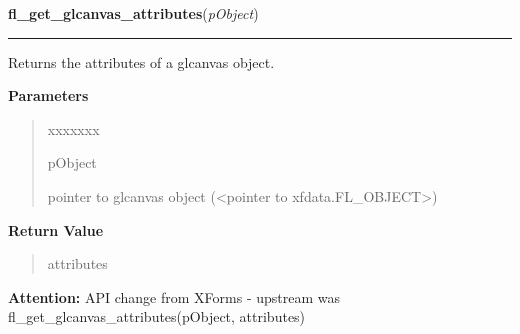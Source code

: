 \hspace{.8\funcindent}\begin{boxedminipage}{\funcwidth}

    \raggedright \textbf{fl\_get\_glcanvas\_attributes}(\textit{pObject})

    \vspace{-1.5ex}

    \rule{\textwidth}{0.5\fboxrule}
\setlength{\parskip}{2ex}
    Returns the attributes of a glcanvas object.

\setlength{\parskip}{1ex}
      \textbf{Parameters}
      \vspace{-1ex}

      \begin{quote}
        \begin{Ventry}{xxxxxxx}

          \item[pObject]

          pointer to glcanvas object ({\textless}pointer to 
          xfdata.FL\_OBJECT{\textgreater})

        \end{Ventry}

      \end{quote}

      \textbf{Return Value}
    \vspace{-1ex}

      \begin{quote}
      attributes

      \end{quote}

\textbf{Attention:} API change from XForms - upstream was 
fl\_get\_glcanvas\_attributes(pObject, attributes)



    \end{boxedminipage}

    \label{xformslib:library:fl_set_glcanvas_direct}

    \vspace{0.5ex}

